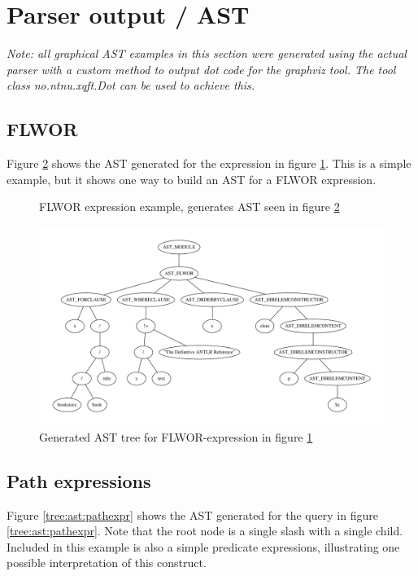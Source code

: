 \section{Parser output / AST}
\label{sect:results:parser_output_ast}
\emph{Note: all graphical AST examples in this section were generated using the
actual parser with a custom method to output dot code for the graphviz tool. The
tool class no.ntnu.xqft.Dot can be used to achieve this.}

\subsection{FLWOR}
Figure \ref{tree:ast:flwor1} shows the AST generated for the expression in
figure \ref{code:ast:flwor1}. This is a simple example, but it shows one way to
build an AST for a FLWOR expression.

\begin{figure}[h]

\caption{FLWOR expression example, generates AST seen in figure \ref{tree:ast:flwor1}}
\label{code:ast:flwor1}
\end{figure}


\begin{figure}[h]
\centering
 \includegraphics[width=1\textwidth]{img/graphs/flwor1}
\caption{Generated AST tree for FLWOR-expression in figure \ref{code:ast:flwor1}}
\label{tree:ast:flwor1}
\end{figure}

\subsection{Path expressions}
Figure \ref{tree:ast:pathexpr} shows the AST generated for the query in figure
\ref{tree:ast:pathexpr}. Note that the root node is a single slash with a
single child. Included in this example is also a simple predicate expressions,
illustrating one possible interpretation of this construct.

